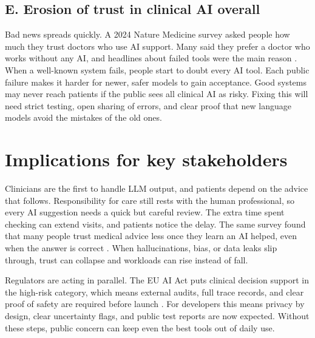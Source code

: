 \documentclass[12pt,a4paper]{scrreprt}
\begin{document}
\subsection*{E. Erosion of trust in clinical AI overall}
Bad news spreads quickly. A 2024 Nature Medicine survey asked people how much they trust doctors who use AI support. Many said they prefer a doctor who works without any AI, and headlines about failed tools were the main reason \autocite{Trust}. When a well-known system fails, people start to doubt every AI tool. Each public failure makes it harder for newer, safer models to gain acceptance. Good systems may never reach patients if the public sees all clinical AI as risky. Fixing this will need strict testing, open sharing of errors, and clear proof that new language models avoid the mistakes of the old ones.


\section*{Implications for key stakeholders}
Clinicians are the first to handle LLM output, and patients depend on the advice that follows. Responsibility for care still rests with the human professional, so every AI suggestion needs a quick but careful review. The extra time spent checking can extend visits, and patients notice the delay. The same survey found that many people trust medical advice less once they learn an AI helped, even when the answer is correct \autocite{Trust}. When hallucinations, bias, or data leaks slip through, trust can collapse and workloads can rise instead of fall.\par
\vspace{\baselineskip}
\noindent
Regulators are acting in parallel. The EU AI Act puts clinical decision support in the high-risk category, which means external audits, full trace records, and clear proof of safety are required before launch \autocite{EUAIAct}. For developers this means privacy by design, clear uncertainty flags, and public test reports are now expected. Without these steps, public concern can keep even the best tools out of daily use.
\end{document}
